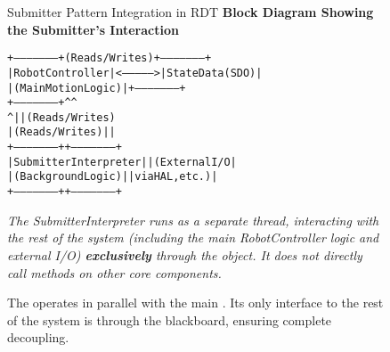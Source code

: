 \begin{figure}[h!]
    \centering
    \begin{infobox}{Submitter Pattern Integration in RDT}
        \textbf{Block Diagram Showing the Submitter's Interaction}
        {\footnotesize
        \begin{alltt}
+---------------------+  (Reads/Writes)  +---------------------+
| RobotController     | <--------------> |   StateData (SDO)   |
| (Main Motion Logic) |                  +---------------------+
+---------------------+                       ^      ^
         ^                                    |      | (Reads/Writes)
         | (Reads/Writes)                     |      |
+---------------------+                +---------------------+
| SubmitterInterpreter|                |   (External I/O     |
| (Background Logic)  |                |    via HAL, etc.)   |
+---------------------+                +---------------------+
        \end{alltt}
        }
        \vspace{0.3cm}
        \textit{The SubmitterInterpreter runs as a separate thread, interacting with the rest of the system (including the main RobotController logic and external I/O) \textbf{exclusively} through the  object. It does not directly call methods on other core components.}
    \end{infobox}
    \vspace{0.3cm}
    \caption{The  operates in parallel with the main . Its only interface to the rest of the system is through the  blackboard, ensuring complete decoupling.}
    \label{fig:submitter_integration}
\end{figure}

